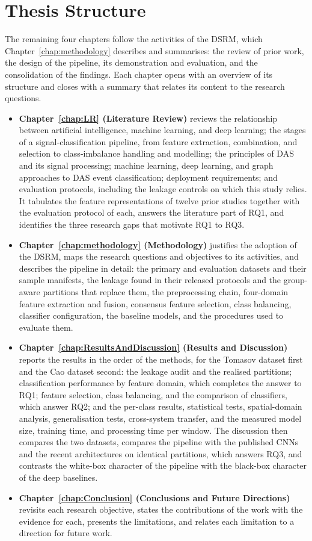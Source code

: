 \section{Thesis Structure}
\label{sec:ThesisStructure}
The remaining four chapters follow the activities of the DSRM, which Chapter~\ref{chap:methodology} describes and  summarises: the review of prior work, the design of the pipeline, its demonstration and evaluation, and the consolidation of the findings. Each chapter opens with an overview of its structure and closes with a summary that relates its content to the research questions.
\begin{itemize}[leftmargin=*, itemsep=4pt]
	\item \textbf{Chapter~\ref{chap:LR} (Literature Review)} reviews the relationship between artificial intelligence, machine learning, and deep learning; the stages of a signal-classification pipeline, from feature extraction, combination, and selection to class-imbalance handling and modelling; the principles of DAS and its signal processing; machine learning, deep learning, and graph approaches to DAS event classification; deployment requirements; and evaluation protocols, including the leakage controls on which this study relies. It tabulates the feature representations of twelve prior studies together with the evaluation protocol of each, answers the literature part of RQ1, and identifies the three research gaps that motivate RQ1 to RQ3.

	\item \textbf{Chapter~\ref{chap:methodology} (Methodology)} justifies the adoption of the DSRM, maps the research questions and objectives to its activities, and describes the pipeline in detail: the primary and evaluation datasets and their sample manifests, the leakage found in their released protocols and the group-aware partitions that replace them, the preprocessing chain, four-domain feature extraction and fusion, consensus feature selection, class balancing, classifier configuration, the baseline models, and the procedures used to evaluate them.

	\item \textbf{Chapter~\ref{chap:ResultsAndDiscussion} (Results and Discussion)} reports the results in the order of the methods, for the Tomasov dataset first and the Cao dataset second: the leakage audit and the realised partitions; classification performance by feature domain, which completes the answer to RQ1; feature selection, class balancing, and the comparison of classifiers, which answer RQ2; and the per-class results, statistical tests, spatial-domain analysis, generalisation tests, cross-system transfer, and the measured model size, training time, and processing time per window. The discussion then compares the two datasets, compares the pipeline with the published CNNs and the recent architectures on identical partitions, which answers RQ3, and contrasts the white-box character of the pipeline with the black-box character of the deep baselines.

	\item \textbf{Chapter~\ref{chap:Conclusion} (Conclusions and Future Directions)} revisits each research objective, states the contributions of the work with the evidence for each, presents the limitations, and relates each limitation to a direction for future work.
\end{itemize}
